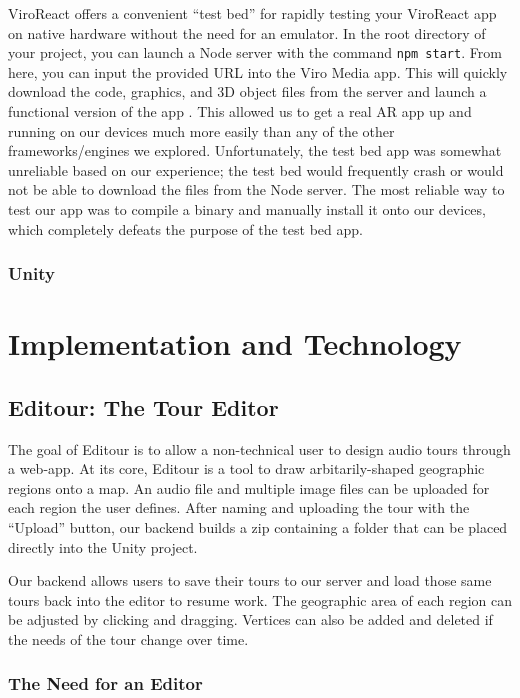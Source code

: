 \documentclass[a4paper, 10pt, american, titlepage]{article}
\begin{document}
ViroReact offers a convenient ``test bed'' for rapidly testing your ViroReact
app on native hardware without the need for an emulator. In the root directory
of your project, you can launch a Node server with the command \texttt{npm
start}. From here, you can input the provided URL into the Viro Media app. This
will quickly download the code, graphics, and 3D object files from the server
and launch a functional version of the app \autocite{viro-testbed2019}. This
allowed us to get a real AR app up and running on our devices much more easily
than any of the other frameworks/engines we explored. Unfortunately, the test
bed app was somewhat unreliable based on our experience; the test bed would
frequently crash or would not be able to download the files from the Node
server. The most reliable way to test our app was to compile a binary and
manually install it onto our devices, which completely defeats the purpose of
the test bed app.

\subsubsection{Unity}
\label{sec:unity}

\section{Implementation and Technology}
\label{sec:implementationAndTechnology}

\subsection{Editour: The Tour Editor}
\label{sec:editour}

The goal of Editour is to allow a non-technical user to design audio tours
through a web-app. At its core, Editour is a tool to draw arbitarily-shaped
geographic regions onto a map. An audio file and multiple image files can be
uploaded for each region the user defines. After naming and uploading the tour
with the ``Upload'' button, our backend builds a zip containing a folder that can
be placed directly into the Unity project.

Our backend allows users to save their tours to our server and load those same
tours back into the editor to resume work.  The geographic area of each region
can be adjusted by clicking and dragging. Vertices can also be added and
deleted if the needs of the tour change over time.

\subsubsection{The Need for an Editor}
\end{document}
